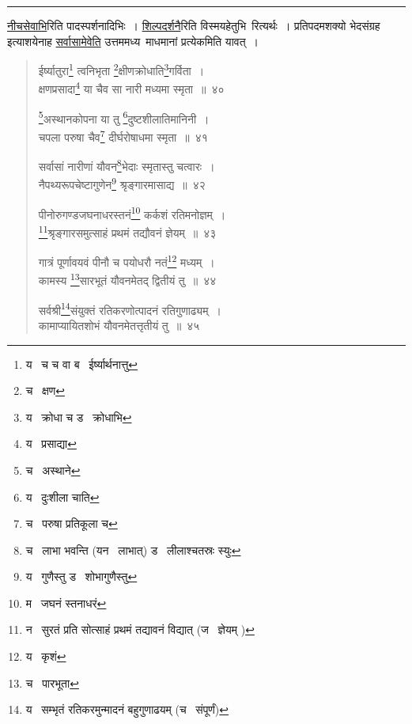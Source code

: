\documentclass[11pt, openany]{book}
\begin{document}
\hrule

\vspace{2mm}
\underline{नीचसेवाभि}रिति पादस्पर्शनादिभिः~। \underline{शिल्पदर्शनै}रिति विस्मयहेतुभि\textendash\ रित्यर्थः~। प्रतिपदमशक्यो भेदसंग्रह इत्याशयेनाह \underline{सर्वासामेवेति} उत्तममध्य\textendash\ माधमानां प्रत्येकमिति यावत्~।

\newpage

\begin{quote}
{\na ईर्ष्यातुरा\renewcommand{\thefootnote}{1}\footnote{य \textendash\  च च वा ब \textendash\  ईर्ष्यार्थनात्तु} त्वनिभृता \renewcommand{\thefootnote}{2}\footnote{च \textendash\  क्षण}क्षीणक्रोधाति\renewcommand{\thefootnote}{3}\footnote{य \textendash\  क्रोधा च ड \textendash\  क्रोधाभि}गर्विता~।\\
क्षणप्रसादा\renewcommand{\thefootnote}{4}\footnote{य \textendash\  प्रसाद्या} या चैव सा नारी मध्यमा स्मृता~॥~४०

\renewcommand{\thefootnote}{5}\footnote{च \textendash\  अस्थाने}अस्थानकोपना या तु \renewcommand{\thefootnote}{6}\footnote{य \textendash\  दुःशीला चाति}दुष्टशीलातिमानिनी~।\\
चपला परुषा चैव\renewcommand{\thefootnote}{7}\footnote{च \textendash\  परुषा प्रतिकूला च} दीर्घरोषाधमा स्मृता~॥~४१ 

सर्वासां नारीणां यौवन\renewcommand{\thefootnote}{8}\footnote{च \textendash\  लाभा भवन्ति (यन \textendash\  लाभात्) ड \textendash\  लीलाश्चतस्रः स्युः}भेदाः स्मृतास्तु चत्वारः~।\\
नैपथ्यरूपचेष्टागुणेन\renewcommand{\thefootnote}{9}\footnote{य \textendash\  गुणैस्तु ड \textendash\  शोभागुणैस्तु} श्रृङ्गारमासाद्य~॥~४२

पीनोरुगण्डजघनाधरस्तनं\renewcommand{\thefootnote}{10}\footnote{म \textendash\  जघनं स्तनाधरं} कर्कशं रतिमनोज्ञम्~।\\
\renewcommand{\thefootnote}{11}\footnote{न \textendash\  सुरतं प्रति सोत्साहं प्रथमं तद्यावनं विद्यात् (ज \textendash\  ज्ञेयम् )}श्रृङ्गारसमुत्साहं प्रथमं तद्यौवनं ज्ञेयम्~॥~४३

गात्रं पूर्णावयवं पीनौ च पयोधरौ नतं\renewcommand{\thefootnote}{12}\footnote{य \textendash\  कृशं} मध्यम्~।\\
कामस्य \renewcommand{\thefootnote}{13}\footnote{च \textendash\  पारभूता}सारभूतं यौवनमेतद् द्वितीयं तु~॥~४४

सर्वश्री\renewcommand{\thefootnote}{14}\footnote{य \textendash\  सम्भृतं रतिकरमुन्मादनं बहुगुणाढयम् (च \textendash\  संपूर्णं)}संयुक्तं रतिकरणोत्पादनं रतिगुणाढ्यम्~।\\
कामाप्यायितशोभं यौवनमेतत्तृतीयं तु~॥~४५}
\end{quote}
\end{document}
